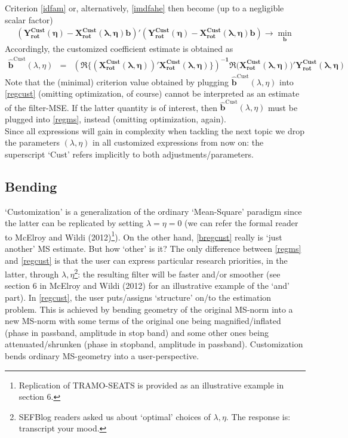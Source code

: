 \documentclass[11pt]{article}
\begin{document}
 Criterion   \ref{idfam} or, alternatively, \ref{imdfahe} then become (up to a negligible scalar factor)
\begin{eqnarray}\label{regcust}
(\mathbf{Y_{\textrm{rot}}^{\textrm{Cust}}(\eta)-X_{\textrm{rot}}^{\textrm{Cust}}(\lambda,\eta)b})'(\mathbf{Y_{\textrm{rot}}^{\textrm{Cust}}(\eta)-X_{\textrm{rot}}^{\textrm{Cust}}(\lambda,\eta)b})\to\min_{\mathbf{b}}
\end{eqnarray}
Accordingly, the customized coefficient estimate is obtained as 
\begin{eqnarray}\label{bregcust}
\mathbf{\hat{b}}^{\textrm{Cust}}(\lambda,\eta)&=&\mathbf{\left(\Re\Bigg\{(X_{\textrm{rot}}^{\textrm{Cust} }(\lambda,\eta))' X_{\textrm{rot}}^{\textrm{Cust}}(\lambda,\eta)\Bigg\}\right)^{-1}\Re(X_{\textrm{rot}}^{\textrm{Cust}}(\lambda,\eta)})'
\mathbf{Y_{\textrm{rot}}^{\textrm{Cust}}(\lambda,\eta)}
\end{eqnarray}
Note that the (minimal) criterion value obtained by plugging  $\mathbf{\hat{b}}^{\textrm{Cust}}(\lambda,\eta)$ into \ref{regcust} (omitting optimization, of course) cannot be interpreted as an estimate of the filter-MSE. If the latter quantity is of interest, then $\mathbf{\hat{b}}^{\textrm{Cust}}(\lambda,\eta)$ must be plugged into \ref{regms}, instead (omitting optimization, again). \\

Since all expressions will gain in complexity when tackling the next topic we drop the parameters $(\lambda,\eta)$ in all customized expressions from now on: the superscript `Cust' refers implicitly to both adjustments/parameters.


\subsection{Bending }

`Customization' is a generalization of  the ordinary `Mean-Square' paradigm since the latter can be replicated by setting $\lambda=\eta=0$ (we can refer the formal reader to McElroy and Wildi (2012)\footnote{Replication of TRAMO-SEATS is provided as an illustrative example in section 6.}).  On the other hand, \ref{bregcust} really is `just another' MS estimate.  But how `other' is it? The only difference between \ref{regms} and \ref{regcust} is that the user can express particular research priorities, in the latter, through $\lambda,\eta$\footnote{SEFBlog readers asked us about `optimal' choices of $\lambda,\eta$. The response is: transcript your mood.}: the resulting filter will be faster and/or smoother (see section 6 in McElroy and Wildi (2012) for an illustrative example of the `and' part). In \ref{regcust}, the user puts/assigns `structure' on/to the estimation problem. This is achieved by bending geometry of the original MS-norm into a new MS-norm with some terms of the original one being magnified/inflated (phase in passband, amplitude in stop band) and some other ones being attenuated/shrunken (phase in stopband, amplitude in passband). Customization bends ordinary MS-geometry into a user-perspective. \\
\end{document}
